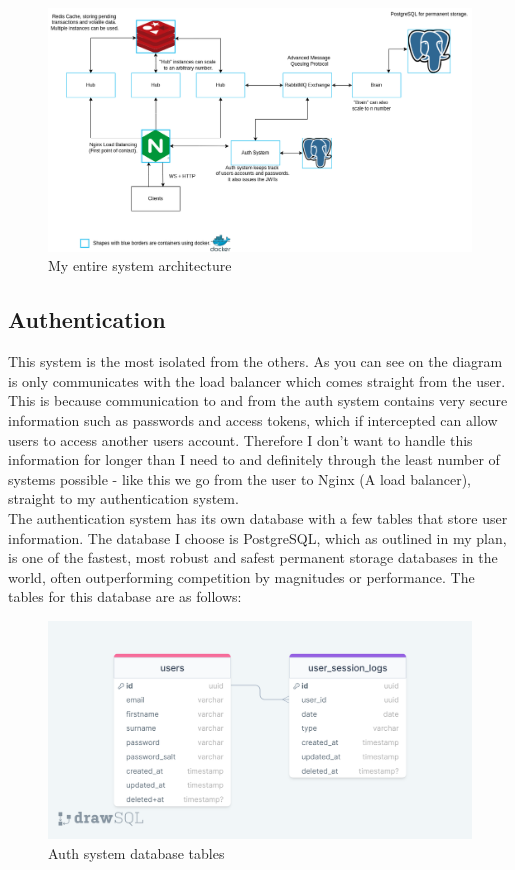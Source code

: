 \documentclass[titlepage]{article}
\begin{document}
\begin{figure}
  \caption{My entire system architecture}
\centering
\hspace*{-3cm}
\includegraphics[width=1.5\textwidth]{Architecture.png}
\end{figure}

\subsection{Authentication}
This system is the most isolated from the others. As you can see on the diagram is only communicates with the load balancer which comes straight from the user. This is because communication to and from the auth system contains very secure information such as passwords and access tokens, which if intercepted can allow users to access another users account. Therefore I don't want to handle this information for longer than I need to and definitely through the least number of systems possible - like this we go from the user to Nginx (A load balancer), straight to my authentication system. \\

The authentication system has its own database with a few tables that store user information. The database I choose is PostgreSQL, which as outlined in my plan, is one of the fastest, most robust and safest permanent storage databases in the world, often outperforming competition by magnitudes or performance. The tables for this database are as follows: \\

\begin{figure}
  \caption{Auth system database tables}
\centering
\includegraphics[width=1\textwidth]{auth_diagram.png}
\end{figure}
\end{document}
